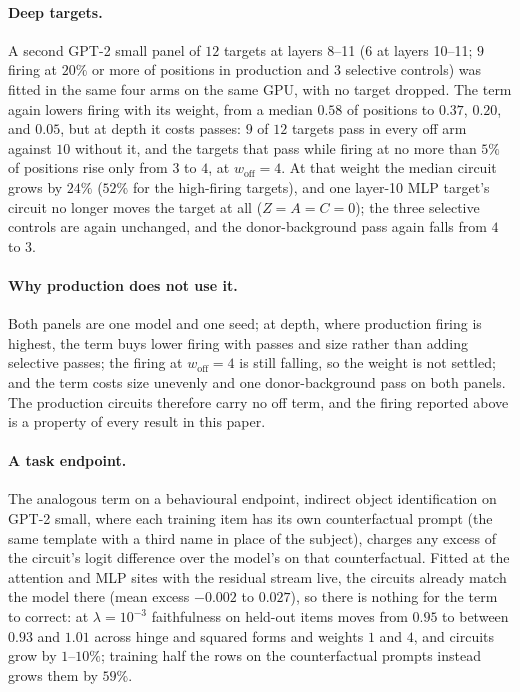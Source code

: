 \documentclass[10pt]{article}
\begin{document}
\paragraph{Deep targets.}
A second GPT-2 small panel of $12$ targets at layers 8--11 ($6$ at layers 10--11; $9$ firing at $20\%$ or more of positions in production and $3$ selective controls) was fitted in the same four arms on the same GPU, with no target dropped.
The term again lowers firing with its weight, from a median $0.58$ of positions to $0.37$, $0.20$, and $0.05$, but at depth it costs passes: $9$ of $12$ targets pass in every off arm against $10$ without it, and the targets that pass while firing at no more than $5\%$ of positions rise only from $3$ to $4$, at $w_{\mathrm{off}} = 4$.
At that weight the median circuit grows by $24\%$ ($52\%$ for the high-firing targets), and one layer-10 MLP target's circuit no longer moves the target at all ($Z = A = C = 0$); the three selective controls are again unchanged, and the donor-background pass again falls from $4$ to $3$.

\paragraph{Why production does not use it.}
Both panels are one model and one seed; at depth, where production firing is highest, the term buys lower firing with passes and size rather than adding selective passes; the firing at $w_{\mathrm{off}} = 4$ is still falling, so the weight is not settled; and the term costs size unevenly and one donor-background pass on both panels.
The production circuits therefore carry no off term, and the firing reported above is a property of every result in this paper.

\paragraph{A task endpoint.}
The analogous term on a behavioural endpoint, indirect object identification on GPT-2 small, where each training item has its own counterfactual prompt (the same template with a third name in place of the subject), charges any excess of the circuit's logit difference over the model's on that counterfactual.
Fitted at the attention and MLP sites with the residual stream live, the circuits already match the model there (mean excess $-0.002$ to $0.027$), so there is nothing for the term to correct: at $\lambda = 10^{-3}$ faithfulness on held-out items moves from $0.95$ to between $0.93$ and $1.01$ across hinge and squared forms and weights $1$ and $4$, and circuits grow by $1$--$10\%$; training half the rows on the counterfactual prompts instead grows them by $59\%$.
\end{document}
